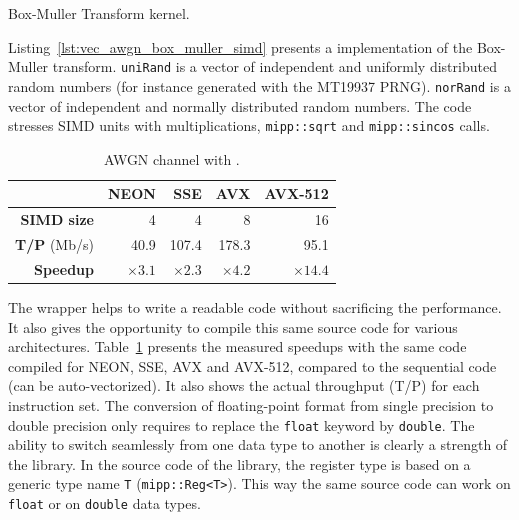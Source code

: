 \begin{listing}
  \inputminted[frame=lines,linenos]{C++}{main/chapter3/src/awgn/box_muller_simd.cpp}
  \caption{Box-Muller Transform \MIPP kernel.}
  \label{lst:vec_awgn_box_muller_simd}
\end{listing}

Listing~\ref{lst:vec_awgn_box_muller_simd} presents a \MIPP implementation of
the Box-Muller transform. \verb|uniRand| is a vector of independent and
uniformly distributed random numbers (for instance generated with the MT19937
PRNG). \verb|norRand| is a vector of independent and normally distributed random
numbers. The code stresses SIMD units with multiplications, \verb|mipp::sqrt|
and \verb|mipp::sincos| calls.

\begin{table}
  \centering
  \caption{AWGN channel with \MIPP.}
  \label{tab:vec_awgn_speedup}
  \begin{tabular}{r | r  r r r}
                      & \textbf{NEON} & \textbf{SSE} & \textbf{AVX} & \textbf{AVX-512} \\ \hline \hline
  \textbf{SIMD size}  & 4             & 4            & 8            & 16               \\ %
  \textbf{T/P} (Mb/s) & 40.9          & 107.4        & 178.3        & 95.1             \\ %
  \textbf{Speedup}    & $\times 3.1$  & $\times 2.3$ & $\times 4.2$ & $\times 14.4$    \\
  \end{tabular}
\end{table}

The \MIPP wrapper helps to write a readable code without sacrificing the
performance. It also gives the opportunity to compile this same source code for
various architectures. Table~\ref{tab:vec_awgn_speedup} presents the measured
speedups with the same \MIPP code compiled for NEON, SSE, AVX and AVX-512,
compared to the sequential code (can be auto-vectorized). It also shows the
actual throughput (T/P) for each instruction set. The conversion of
floating-point format from single precision to double precision only requires to
replace the \verb|float| keyword by \verb|double|. The ability to switch
seamlessly from one data type to another is clearly a strength of the \MIPP
library. In the source code of the \AFFECT library, the register type is based
on a generic type name \verb|T| (\verb|mipp::Reg<T>|). This way the same source
code can work on \verb|float| or on \verb|double| data types.

